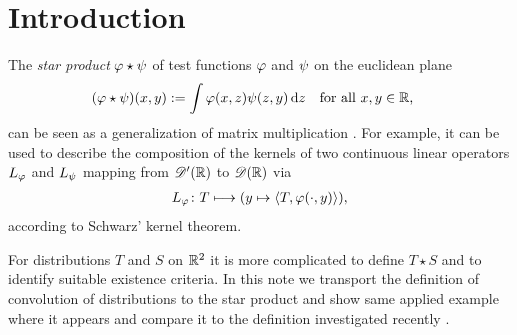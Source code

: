 \section{Introduction}
\label{int}

The {\em star product} $ \varphi \star \psi $
of test functions $ \varphi $ and $ \psi $ on the euclidean plane
\begin{align}
    ( \varphi \star \psi )(x,y)
    &:=
    \int \varphi(x,z)\psi(z,y) \,\mathrm{ d }{ z }
    &&\text{for all $ x,y \in \mathbb{ R } $,}
\end{align}
can be seen as a generalization of matrix multiplication \cite{RBG025}.
For example, it can be used to describe the composition of the kernels
of two continuous linear operators $ L_\varphi $ and $ L_\psi $
mapping from $ \mathscr{  D  }'( \mathbb{ R } ) $ to $ \mathscr{  D  }( \mathbb{ R } ) $ via
\begin{align}
    L_\varphi \colon T \longmapsto ( y \mapsto \langle T , \varphi(\cdot,y) \rangle ),
\end{align}
according to Schwarz' kernel theorem.

For distributions $ T $ and $ S $ on $ \mathbb{ R }^2 $
it is more complicated to define $ T \star S $
and to identify suitable existence criteria.
In this note we transport the definition
of convolution of distributions to the star product
and show same applied example where it appears
and compare it to the definition investigated recently \cite{RBG025}.